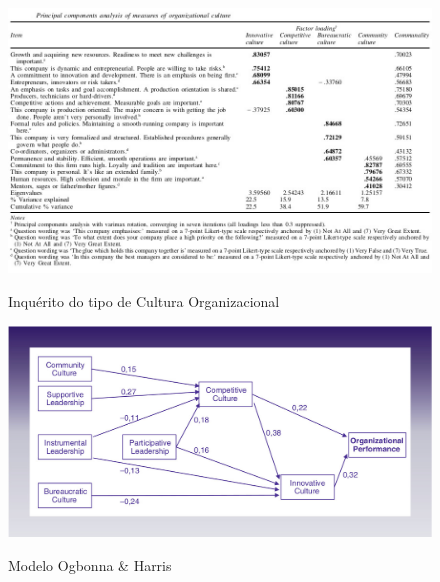 \vspace{1cm}
\begin{figure}[H]
	\centering
	\includegraphics[scale=.6]{./image/CORGA/OB/Culture.jpg}\\
	\caption{Inquérito do tipo de Cultura Organizacional \cite{article_1}}
\end{figure}\par
\begin{figure}[H]
	\centering
	\includegraphics[scale=.35]{./image/CORGA/OB/Ogbonna_Harris.jpg}\\
	\caption{Modelo Ogbonna \& Harris \cite{article_1}}
	\label{Modelo}
\end{figure}\par
